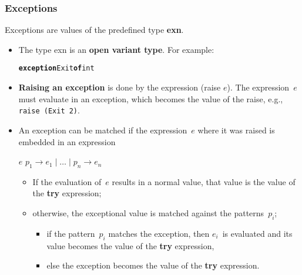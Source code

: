 

\begin{frame}
  \frametitle{Exceptions}

  Exceptions are values of the predefined type \textbf{exn}.
  \begin{itemize}

    \item The type \textsf{exn} is an \textbf{open variant type}. For
      example:
      \begin{alltt}
        \textbf{exception} Exit \textbf{of} int
      \end{alltt}

    \item \textbf{Raising an exception} is done by the expression
      (\textsf{raise} $e$). The expression~\(e\) must evaluate in an
      exception, which becomes the value of the raise, e.g.,
      \texttt{raise (Exit 2)}.

    \item An exception can be matched if the expression~\(e\) where it
      was raised is embedded in an expression
      \begin{center}
        \Xtry{} $e$ \Xwith{} $p_1 \rightarrow e_1 \mid \ldots
        \mid p_n \rightarrow e_n$
      \end{center}
      \begin{itemize}

        \item If the evaluation of~\(e\) results in a normal value,
          that value is the value of the \textbf{try} expression;

        \item otherwise, the exceptional value is matched against the
          patterns~\(p_i\);
          \begin{itemize}

            \item if the pattern~\(p_i\) matches the exception, then
              \(e_i\)~is evaluated and its value becomes the value of
              the \textbf{try} expression,

            \item else the exception becomes the value of the
              \textbf{try} expression.

          \end{itemize}


      \end{itemize}

  \end{itemize}

\end{frame}

